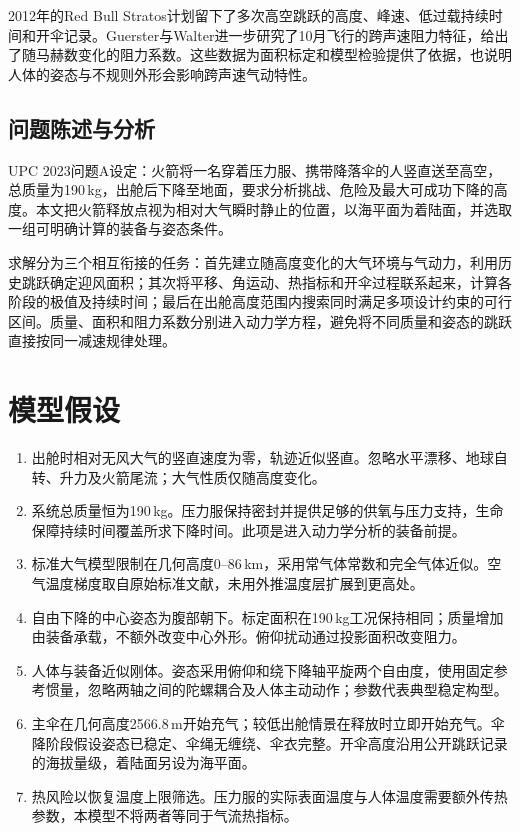 \documentclass[11pt,a4paper]{article}
\begin{document}
2012年的Red Bull Stratos计划留下了多次高空跳跃的高度、峰速、低过载持续时间和开伞记录\cite{summit}。Guerster与Walter进一步研究了10月飞行的跨声速阻力特征，给出了随马赫数变化的阻力系数\cite{guerster}。这些数据为面积标定和模型检验提供了依据，也说明人体的姿态与不规则外形会影响跨声速气动特性。

\subsection{问题陈述与分析}
UPC 2023问题A设定：火箭将一名穿着压力服、携带降落伞的人竖直送至高空，总质量为190\,kg，出舱后下降至地面，要求分析挑战、危险及最大可成功下降的高度\cite{problem}。本文把火箭释放点视为相对大气瞬时静止的位置，以海平面为着陆面，并选取一组可明确计算的装备与姿态条件。

求解分为三个相互衔接的任务：首先建立随高度变化的大气环境与气动力，利用历史跳跃确定迎风面积；其次将平移、角运动、热指标和开伞过程联系起来，计算各阶段的极值及持续时间；最后在出舱高度范围内搜索同时满足多项设计约束的可行区间。质量、面积和阻力系数分别进入动力学方程，避免将不同质量和姿态的跳跃直接按同一减速规律处理。

\section{模型假设}
\begin{enumerate}
\item 出舱时相对无风大气的竖直速度为零，轨迹近似竖直。忽略水平漂移、地球自转、升力及火箭尾流；大气性质仅随高度变化。
\item 系统总质量恒为190\,kg。压力服保持密封并提供足够的供氧与压力支持，生命保障持续时间覆盖所求下降时间。此项是进入动力学分析的装备前提。
\item 标准大气模型限制在几何高度0--86\,km，采用常气体常数和完全气体近似。空气温度梯度取自原始标准文献，未用外推温度层扩展到更高处。
\item 自由下降的中心姿态为腹部朝下。标定面积在190\,kg工况保持相同；质量增加由装备承载，不额外改变中心外形。俯仰扰动通过投影面积改变阻力。
\item 人体与装备近似刚体。姿态采用俯仰和绕下降轴平旋两个自由度，使用固定参考惯量，忽略两轴之间的陀螺耦合及人体主动动作；参数代表典型稳定构型。
\item 主伞在几何高度2566.8\,m开始充气；较低出舱情景在释放时立即开始充气。伞降阶段假设姿态已稳定、伞绳无缠绕、伞衣完整。开伞高度沿用公开跳跃记录的海拔量级，着陆面另设为海平面。
\item 热风险以恢复温度上限筛选。压力服的实际表面温度与人体温度需要额外传热参数，本模型不将两者等同于气流热指标。
\end{enumerate}
\end{document}
